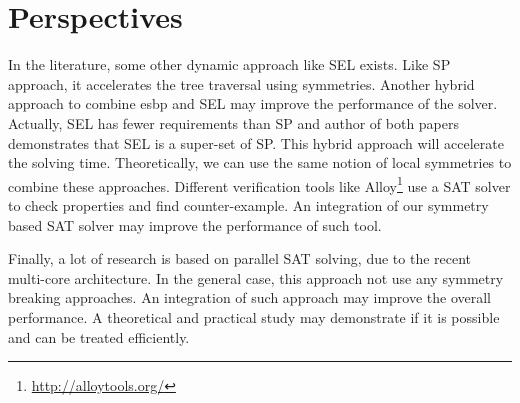 %
%
%
%
%
%
%
%
%

\section{Perspectives}
In the literature, some other dynamic approach like SEL\cite{devriendt2017symmetric} exists. Like SP approach,
it accelerates the tree traversal using symmetries. Another hybrid approach to combine esbp and SEL may improve the
performance of the solver. Actually, SEL has fewer requirements than SP and author of both papers demonstrates that
SEL is a super-set of SP. This hybrid approach will accelerate the solving time.
Theoretically, we can use the same notion of local symmetries to combine these approaches.
Different verification tools like Alloy\footnote{\url{http://alloytools.org/}} use a SAT solver to check properties and find
counter-example. An integration of our symmetry based SAT solver may improve the performance of such tool.

Finally, a lot of research is based on parallel SAT solving, due to the recent multi-core architecture. In the general case,
this approach not use any symmetry breaking approaches. An integration of such approach may improve the overall performance.
A theoretical and practical study may demonstrate if it is possible and can be treated efficiently.

